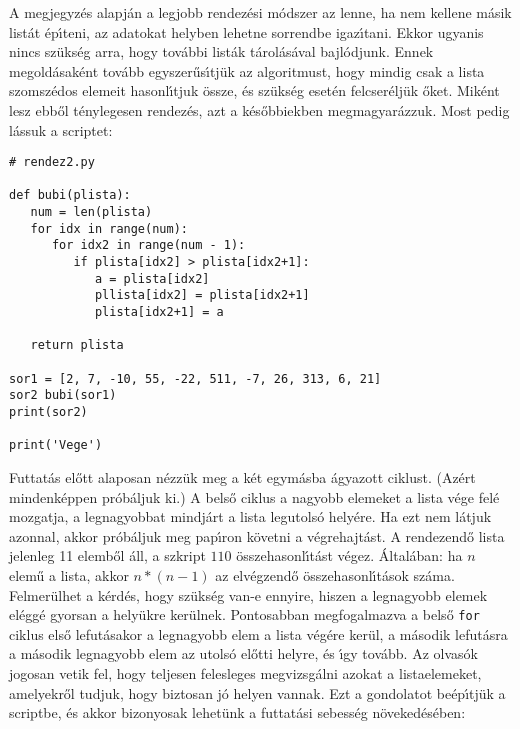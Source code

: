 \documentclass[12pt]{article}
\newcounter{megold}
\begin{document}
A megjegyz\'es alapj\'an a legjobb rendez\'esi m\'odszer az lenne, ha nem kellene m\'asik list\'at \'ep\'{\i}teni, 
az adatokat helyben lehetne sorrendbe igaz\'{\i}tani. Ekkor ugyanis nincs sz\"uks\'eg arra, hogy tov\'abbi list\'ak 
t\'arol\'as\'aval bajl\'odjunk. Ennek megold\'asak\'ent tov\'abb egyszer\H{u}s\'{\i}tj\"uk az algoritmust, hogy 
mindig csak a lista szomsz\'edos elemeit hasonl\'{\i}tjuk \"ossze, \'es sz\"uks\'eg eset\'en felcser\'elj\"uk 
\H{o}ket. Mik\'ent lesz ebb\H{o}l t\'enylegesen rendez\'es, azt a k\'es\H{o}bbiekben megmagyar\'azzuk. Most pedig 
l\'assuk a scriptet:

\begin{Verbatim}[fontsize=\small]
# rendez2.py

def bubi(plista):
   num = len(plista)
   for idx in range(num):
      for idx2 in range(num - 1):
         if plista[idx2] > plista[idx2+1]:
            a = plista[idx2]
            pllista[idx2] = plista[idx2+1]
            plista[idx2+1] = a

   return plista

sor1 = [2, 7, -10, 55, -22, 511, -7, 26, 313, 6, 21]
sor2 bubi(sor1)
print(sor2)

print('Vege')   
\end{Verbatim}

Futtat\'as el\H{o}tt alaposan n\'ezz\"uk meg a k\'et egym\'asba \'agyazott ciklust. (Az\'ert mindenk\'eppen 
pr\'ob\'aljuk ki.) A bels\H{o} ciklus a nagyobb elemeket a lista v\'ege fel\'e mozgatja, a legnagyobbat mindj\'art 
a lista legutols\'o hely\'ere. Ha ezt nem l\'atjuk azonnal, akkor pr\'ob\'aljuk meg pap\'{\i}ron k\"ovetni a 
v\'egrehajt\'ast. A rendezend\H{o} lista jelenleg 11 elemb\H{o}l \'all, a szkript $110$ \"osszehasonl\'{\i}t\'ast 
v\'egez. \'Altal\'aban: ha $n$ elem\H{u} a lista, akkor $n*(n-1)$ az elv\'egzend\H{o} \"osszehasonl\'{\i}t\'asok 
sz\'ama. Felmer\"ulhet a k\'erd\'es, hogy sz\"uks\'eg van-e ennyire, hiszen a legnagyobb elemek el\'egg\'e gyorsan 
a hely\"ukre ker\"ulnek. Pontosabban megfogalmazva a bels\H{o} {\tt for} ciklus els\H{o} lefut\'asakor a legnagyobb 
elem a lista v\'eg\'ere ker\"ul, a m\'asodik lefut\'asra a m\'asodik legnagyobb elem az utols\'o el\H{o}tti helyre, 
\'es \'{\i}gy tov\'abb. Az olvas\'ok jogosan vetik fel, hogy teljesen felesleges megvizsg\'alni azokat a listaelemeket, 
amelyekr\H{o}l tudjuk, hogy biztosan j\'o helyen vannak. Ezt a gondolatot be\'ep\'{\i}tj\"uk a scriptbe, \'es akkor 
bizonyosak lehet\"unk a futtat\'asi sebess\'eg n\"oveked\'es\'eben:
\end{document}
